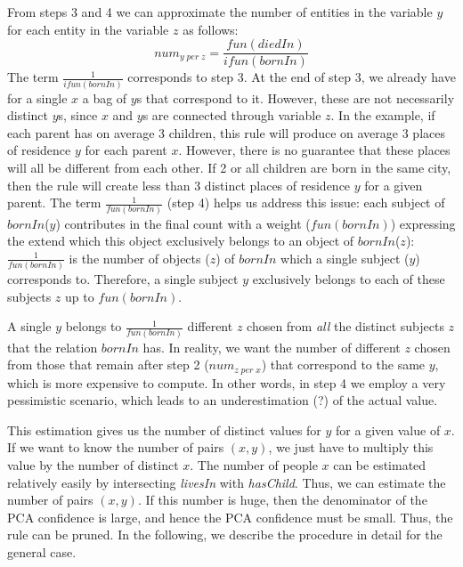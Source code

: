 {From steps 3 and 4 we can approximate the number of entities in the variable $y$ for each entity in the variable $z$ as follows:
$$
 num_{y \; per \; z}= \frac{fun(diedIn)}{ifun(bornIn)}
$$
The term $\frac{1}{ifun(bornIn)}$ corresponds to step 3. At the end of step 3, we already have for a single $x$ a bag of $y$s that correspond to it.
However, these are not necessarily distinct $y$s, since $x$ and $y$s are connected through variable $z$.
In the example, if each parent has on average 3 children, this rule will produce on average 3 places of residence $y$ for each parent $x$. However, there is no guarantee that these places will all be different from each other.
If 2 or all children are born in the same city, then the rule will create less than 3 distinct places of residence $y$ for a given parent.
The term $\frac{1}{fun(bornIn)}$ (step 4) helps us address this issue: each subject of $bornIn$($y$) contributes in the final count with a weight ($fun(bornIn)$) expressing the extend which
this object exclusively belongs to an object of $bornIn$($z$):
$\frac{1}{fun(bornIn)}$ is the number of objects ($z$) of $bornIn$  which a single subject ($y$) corresponds to. Therefore, a single subject $y$ exclusively belongs to each of these subjects $z$ up to $fun(bornIn)$.

A single $y$ belongs to $\frac{1}{fun(bornIn)}$ different $z$ chosen from \emph{all} the distinct subjects $z$ that the relation $bornIn$ has.
 In reality, we want the number of different $z$ chosen from those that remain after step 2 ($num_{z\; per \; x}$) that correspond to the same $y$, which is more expensive to compute.
In other words, in step 4 we employ a very pessimistic scenario, which leads to an underestimation (?) of the actual value.

This estimation gives us the number of distinct values for $y$ for a given value of $x$.
If we want to know the number of pairs $(x,y)$, we just have to multiply this value by the number of distinct $x$.
The number of people $x$ can be estimated relatively easily by intersecting \emph{livesIn} with \emph{hasChild}.
Thus, we can estimate the number of pairs $(x,y)$.
If this number is huge, then the denominator of the PCA confidence is large, and hence the PCA confidence must be small.
Thus, the rule can be pruned. In the following, we describe the procedure in detail for the general case.

}
